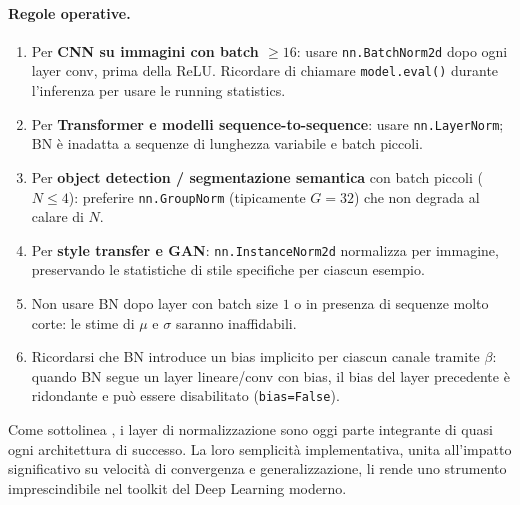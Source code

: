 \paragraph{Regole operative.}
\begin{enumerate}
  \item Per \textbf{CNN su immagini con batch $\geq 16$}: usare
        \texttt{nn.BatchNorm2d} dopo ogni layer conv, prima della ReLU.
        Ricordare di chiamare \texttt{model.eval()} durante l'inferenza per
        usare le running statistics.
  \item Per \textbf{Transformer e modelli sequence-to-sequence}: usare
        \texttt{nn.LayerNorm}; BN è inadatta a sequenze di lunghezza
        variabile e batch piccoli.
  \item Per \textbf{object detection / segmentazione semantica} con batch
        piccoli ($N \leq 4$): preferire \texttt{nn.GroupNorm} (tipicamente
        $G = 32$) che non degrada al calare di $N$.
  \item Per \textbf{style transfer e GAN}: \texttt{nn.InstanceNorm2d}
        normalizza per immagine, preservando le statistiche di stile
        specifiche per ciascun esempio.
  \item Non usare BN dopo layer con batch size $1$ o in presenza di
        sequenze molto corte: le stime di $\mu$ e $\sigma$ saranno
        inaffidabili.
  \item Ricordarsi che BN introduce un bias implicito per ciascun canale
        tramite $\beta$: quando BN segue un layer lineare/conv con bias, il
        bias del layer precedente è ridondante e può essere disabilitato
        (\texttt{bias=False}).
\end{enumerate}

Come sottolinea \citet{bishop2024}, i layer di normalizzazione sono oggi
parte integrante di quasi ogni architettura di successo. La loro semplicità
implementativa, unita all'impatto significativo su velocità di convergenza e
generalizzazione, li rende uno strumento imprescindibile nel toolkit del Deep
Learning moderno.
